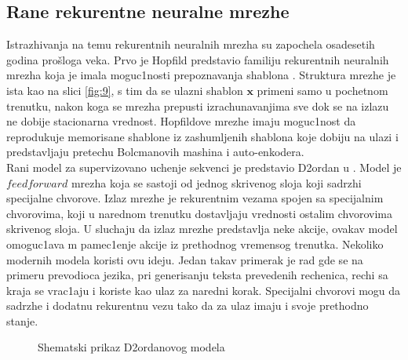 \documentclass[a4paper, openany, oneside, 11pt]{book}
\begin{document}
\subsection{Rane rekurentne neuralne mrezhe}
Istrazhivanja na temu rekurentnih neuralnih mrezha su zapochela osadesetih godina prošloga veka. Prvo je Hopfild predstavio familiju rekurentnih neuralnih mrezha koja je imala moguc1nosti prepoznavanja shablona \cite{Hopfild}. Struktura mrezhe je ista kao na slici \ref{fig:9}, s tim da se ulazni shablon $\mathbf{x}$ primeni samo u pochetnom trenutku, nakon koga se mrezha prepusti izrachunavanjima  sve dok se na izlazu ne dobije stacionarna vrednost. Hopfildove mrezhe imaju moguc1nost da reprodukuje memorisane shablone iz zashumljenih shablona koje dobiju na ulazi i predstavljaju pretechu Bolcmanovih mashina i auto-enkodera.\\
Rani model za supervizovano uchenje sekvenci je predstavio D2ordan u \cite{jordan}. Model je $feedforward$ mrezha koja se sastoji od jednog skrivenog sloja koji sadrzhi specijalne chvorove. Izlaz mrezhe je rekurentnim vezama spojen sa specijalnim chvorovima, koji u narednom trenutku dostavljaju vrednosti ostalim chvorovima skrivenog sloja. U sluchaju da izlaz mrezhe predstavlja neke akcije, ovakav model omoguc1ava m
pamec1enje akcije iz prethodnog vremensog trenutka. Nekoliko modernih modela koristi ovu ideju. Jedan takav primerak je rad \cite{Sutskever} gde se na primeru prevodioca jezika, pri generisanju teksta prevedenih rechenica, rechi sa kraja se vrac1aju i koriste kao ulaz za naredni korak. Specijalni chvorovi mogu da sadrzhe i dodatnu rekurentnu vezu tako da za ulaz imaju i svoje prethodno stanje.
\begin{figure}[!h]
\hspace*{0.3\linewidth}
\caption{Shemat\-ski prikaz D2ordanovog modela}
\label{fig:10}
\end{figure}
\end{document}
